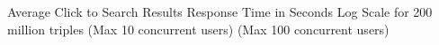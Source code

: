 \centering
Average Click to Search Results Response Time in Seconds Log Scale for 200 million triples\newline
(Max 10 concurrent users) (Max 100 concurrent users)
